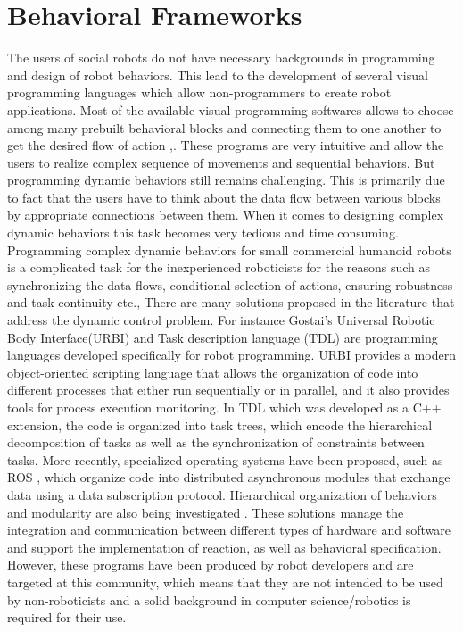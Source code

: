 {\section{Behavioral Frameworks} %
The users of social robots do not have necessary backgrounds in programming and design of robot behaviors. This lead to the development of several visual programming languages which allow non-programmers to create robot applications. Most of the available visual programming softwares allows to choose among many prebuilt behavioral blocks and connecting them to one another to get the desired flow of action \cite{MSRS4},\cite{Choregraphe}. These programs are very intuitive and allow the users to realize complex sequence of movements and sequential behaviors. But programming dynamic behaviors still remains challenging. This is primarily due to fact that the users have to think about the data flow between various blocks by appropriate connections between them. When it comes to designing complex dynamic behaviors this task becomes very tedious and time consuming.  Programming complex dynamic behaviors for small commercial humanoid robots is a complicated task for the inexperienced roboticists \cite{berenz2014targets} for the reasons such as synchronizing the data flows, conditional selection of actions, ensuring robustness and task continuity etc., There are many solutions  proposed in the literature that address the dynamic control problem. For instance Gostai's Universal Robotic Body Interface(URBI) \cite{baillie2008urbi} and Task description language (TDL) \cite{simmons1998task} are programming languages developed specifically for robot programming. URBI provides a modern object-oriented scripting language that allows the organization of code into different processes that either run sequentially or in parallel, and it also provides tools for process execution monitoring. In TDL which was developed as a C++ extension, the code is organized into task trees, which encode the hierarchical decomposition of tasks as well as the synchronization of constraints between tasks. More recently, specialized operating systems have been proposed, such as ROS \cite{quigley2009ros}, which organize code into distributed asynchronous modules that exchange data using a data subscription protocol. Hierarchical organization of behaviors and modularity are also being investigated \cite{jaeger1998dual} \cite{Baldassarre:2013:CRM:2560111} \cite{hurdus2008behavioral}. These solutions manage the integration and communication between different types of hardware and software and support the implementation of reaction, as well as behavioral specification. However, these programs have been produced by robot developers and are targeted at this community, which means that they are not intended to be used by non-roboticists and a solid background in computer science/robotics is required for their use.
}
